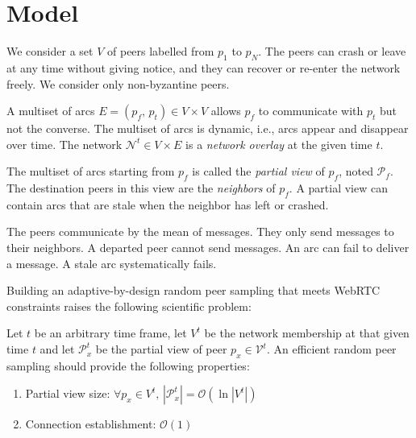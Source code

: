 
\section{Model}

We consider a set $V$ of peers labelled from $p_1$ to $p_N$.  The peers can
crash or leave at any time without giving notice, and they can recover or
re-enter the network freely. We consider only non-byzantine peers.

A multiset of arcs $E = (p_f,\,p_t) \in V \times V$ allows $p_f$ to communicate
with $p_t$ but not the converse. The multiset of arcs is dynamic, i.e., arcs
appear and disappear over time. The network $\mathcal{N}^t \in V \times E$ is a
\emph{network overlay} at the given time $t$.

The multiset of arcs starting from $p_f$ is called the \emph{partial view} of
$p_f$, noted $\mathcal{P}_f$. The destination peers in this view are the
\emph{neighbors} of $p_f$. A partial view can contain arcs that are stale when
the neighbor has left or crashed.

The peers communicate by the mean of messages. They only send messages to their
neighbors. A departed peer cannot send messages. An arc can fail to deliver a
message. A stale arc systematically fails.

Building an adaptive-by-design random peer sampling that meets WebRTC
constraints raises the following scientific problem:
\begin{problem}
  Let $t$ be an arbitrary time frame, let $V^t$ be the network membership at
  that given time $t$ and let $\mathcal{P}_x^t$ be the partial view of peer
  $p_x \in \mathcal{V}^t$.  An efficient random peer sampling should provide
  the following properties:
  \begin{enumerate}
  \item Partial view size: \hfill
    $\forall p_x \in V^t,\, |\mathcal{P}_x^t| = \mathcal{O} (\ln
    |V^t|)$      
  \item Connection establishment: \hfill $\mathcal{O}(1)$
  \end{enumerate}
\end{problem}

